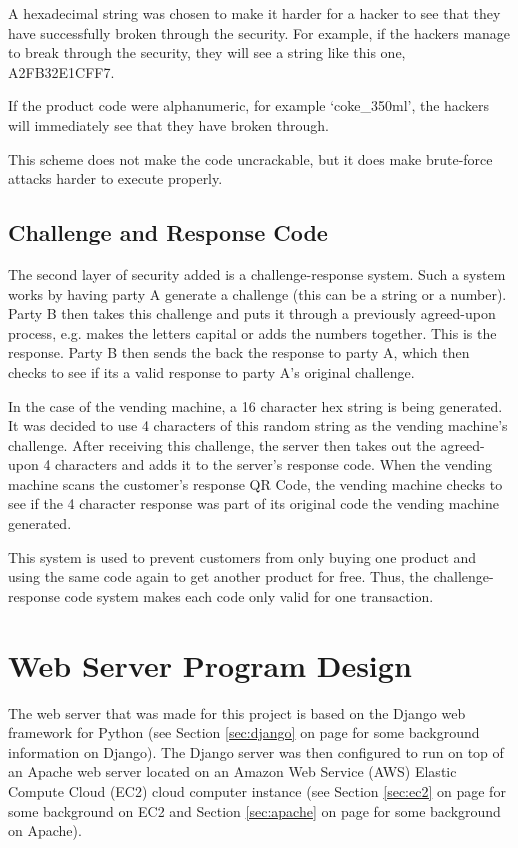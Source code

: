 A hexadecimal string was chosen to make it
harder for a hacker to see that they have successfully broken through the
security. For example, if the hackers manage to break through the security,
they will see a string like this one, A2FB32E1CFF7.

If the product code were alphanumeric, for example `coke\_350ml', the hackers
will immediately see that they have broken through.

This scheme does not make the code uncrackable, but it does make brute-force
attacks harder to execute properly.

\subsection{Challenge and Response Code}
\label{sec:challenge-response}

The second layer of security added is a challenge-response system. Such a system
works by having party A generate a challenge (this can be a string or a number).
Party B then takes this challenge and puts it through a previously agreed-upon
process, e.g. makes the letters capital or adds the numbers together. This
is the response. Party B then sends the back the response to party A, which then
checks to see if its a valid response to party A's original challenge.

In the case of the vending machine, a 16 character hex string is being
generated. It was decided to use 4 characters of this random string as the
vending machine's challenge. After receiving this challenge, the server then
takes out the agreed-upon 4 characters and adds it to the server's response
code. When the vending machine scans the customer's response QR Code, the
vending machine checks to see if the 4 character response was part of its
original code the vending machine generated.

This system is used to prevent customers from only buying one product and using
the same code again to get another product for free. Thus, the
challenge-response code system makes each code only valid for one transaction.

\section{Web Server Program Design}

The web server that was made for this project is based on the Django web framework for Python
(see Section \ref{sec:django} on page \pageref{sec:django} for some background
information on Django). The Django server was then configured to run on top of
an Apache web server located on an Amazon Web Service (AWS) Elastic Compute
Cloud (EC2) cloud computer instance (see Section \ref{sec:ec2} on page
\pageref{sec:ec2} for some background on EC2 and Section \ref{sec:apache} on
page \pageref{sec:apache} for some background on Apache).

